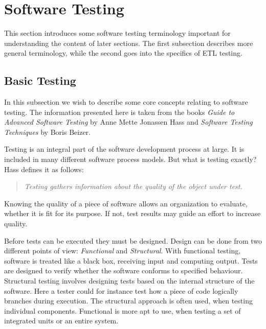 \section{Software Testing}\label{sect:btesting}
This section introduces some software testing terminology important for understanding the content of later sections. The first subsection describes more general terminology, while the second goes into the specifics of ETL testing.

\subsection{Basic Testing}
In this subsection we wish to describe some core concepts relating to software testing. The information presented here is taken from the books \textit{Guide to Advanced Software Testing} by Anne Mette Jonassen Hass\cite{Hass} and \textit{Software Testing Techniques} by Boris Beizer\cite{Beizer}.

Testing is an integral part of the software development process at large. It is included in many different software process models. But what is testing exactly? Hass defines it as follows:
\begin{quotation} \textit{Testing gathers information about the quality of the object under test.}\end{quotation}
Knowing the quality of a piece of software allows an organization to evaluate, whether it is fit for its purpose. If not, test results may guide an effort to increase quality.

Before tests can be executed they must be designed. Design can be done from two different points of view: \emph{Functional} and \emph{Structural}. With functional testing, software is treated like a black box, receiving input and computing output. Tests are designed to verify whether the software conforms to specified behaviour. Structural testing involves designing tests based on the internal structure of the software. Here a tester could for instance test how a piece of code logically branches during execution. The structural approach is often used, when testing individual components. Functional is more apt to use, when testing a set of integrated units or an entire system.

